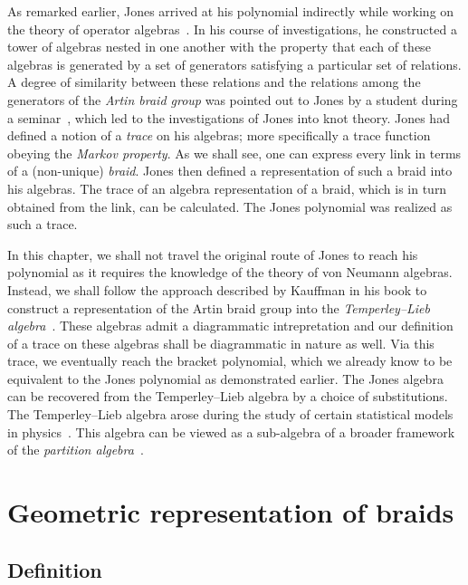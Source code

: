 As remarked earlier, Jones arrived at his polynomial indirectly while working on the theory of operator algebras~\cite{jones}. In his course of investigations, he constructed a tower of algebras nested in one another with the property that each of these algebras is generated by a set of generators satisfying a particular set of relations. A degree of similarity between these relations and the relations among the generators of the \textit{Artin braid group} was pointed out to Jones by a student during a seminar~\cite[p.~216]{cromwell}, which led to the investigations of Jones into knot theory. Jones had defined a notion of a \textit{trace} on his algebras; more specifically a trace function obeying the \textit{Markov property}. As we shall see, one can express every link in terms of a (non-unique) \textit{braid}. Jones then defined a representation of such a braid into his algebras. The trace of an algebra representation of a braid, which is in turn obtained from the link, can be calculated. The Jones polynomial was realized as such a trace.

In this chapter, we shall not travel the original route of Jones to reach his polynomial as it requires the knowledge of the theory of von Neumann algebras. Instead, we shall follow the approach described by Kauffman in his book to construct a representation of the Artin braid group into the \textit{Temperley--Lieb algebra}~\cite[chp.~8]{kauffman}. These algebras admit a diagrammatic intrepretation and our definition of a trace on these algebras shall be diagrammatic in nature as well. Via this trace, we eventually reach the bracket polynomial, which we already know to be equivalent to the Jones polynomial as demonstrated earlier. The Jones algebra can be recovered from the Temperley--Lieb algebra by a choice of substitutions. The Temperley--Lieb algebra arose during the study of certain statistical models in physics~\cite{temperley-lieb}. This algebra can be viewed as a sub-algebra of a broader framework of the \textit{partition algebra}~\cite{partition-algebra}.

\section{Geometric representation of braids}

\subsection{Definition}

